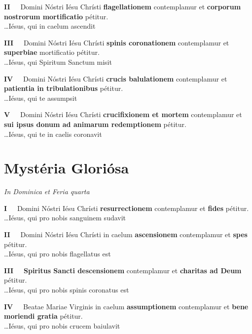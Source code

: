 \documentclass[paper=a5,pagesize=pdftex,fontsize=10pt,headinclude=on,twoside=off]{scrbook}
\newcommand{\mysterium}[1]{\textbf{#1}}
\newcommand{\mysteriumnumero}[1]{\textbf{#1~\textendash~}}
\newcommand{\fructum}[1]{\textbf{#1}}
\newcommand{\dies}[1]{\vspace{-0.6cm}\begin{center}\textit{\tiny#1}\end{center}\vspace{-0.2cm}}
\begin{document}
\mysteriumnumero{II} Domini Nóstri Iésu Chrísti \mysterium{flagellationem} contemplamur et \fructum{corporum nostrorum mortificatio} pétitur.\\
\hspace*{0pt}\hfill \ldots Iésus, qui in caelum ascendit

\mysteriumnumero{III} Domini Nóstri Iésu Chrísti \mysterium{spinis coronationem} contemplamur et \fructum{superbiae} mortificatio pétitur.\\
\hspace*{0pt}\hfill \ldots Iésus, qui Spiritum Sanctum misit

\mysteriumnumero{IV} Domini Nóstri Iésu Chrísti \mysterium{crucis balulationem} contemplamur et \fructum{patientia in tribulationibus} pétitur.\\
\hspace*{0pt}\hfill \ldots Iésus, qui te assumpsit

\mysteriumnumero{V} Domini Nóstri Iésu Chrísti \mysterium{crucifixionem et mortem} contemplamur et \fructum{sui ipsus donum ad animarum redemptionem} pétitur.\\
\hspace*{0pt}\hfill \ldots Iésus, qui te in caelis coronavit

\newpage 

\section{Mystéria Gloriósa}
\dies{In Dominica et Feria quarta}

\mysteriumnumero{I} Domini Nóstri Iésu Chrísti \mysterium{resurrectionem} contemplamur et \fructum{fides} pétitur.\\
\hspace*{0pt}\hfill \ldots Iésus, qui pro nobis sanguinem sudavit

\mysteriumnumero{II} Domini Nóstri Iésu Chrísti in caelum \mysterium{ascensionem} contemplamur et \fructum{spes} pétitur.\\
\hspace*{0pt}\hfill \ldots Iésus, qui pro nobis flagellatus est

\mysteriumnumero{III} \mysterium{Spiritus Sancti descensionem} contemplamur et \fructum{charitas ad Deum} pétitur.\\
\hspace*{0pt}\hfill \ldots Iésus, qui pro nobis spinis coronatus est

\mysteriumnumero{IV} Beatae Mariae Virginis in caelum \mysterium{assumptionem} contemplamur et \fructum{bene moriendi gratia} pétitur.\\
\hspace*{0pt}\hfill \ldots Iésus, qui pro nobis crucem baiulavit
\end{document}
